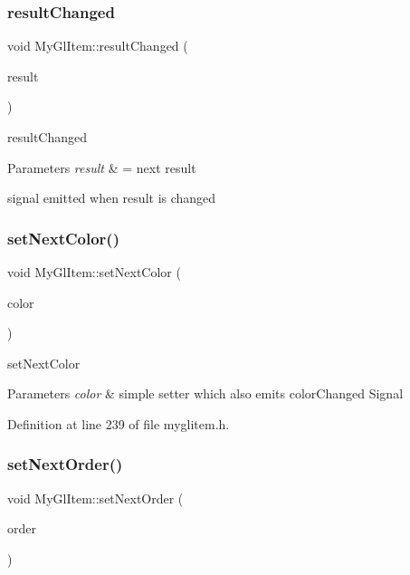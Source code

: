 \subsubsection{\texorpdfstring{resultChanged}{resultChanged}}
{\footnotesize\ttfamily void My\+Gl\+Item\+::result\+Changed (\begin{DoxyParamCaption}\item[{Q\+List$<$ int $>$}]{result }\end{DoxyParamCaption})\hspace{0.3cm}{\ttfamily [signal]}}



result\+Changed 


\begin{DoxyParams}{Parameters}
{\em result} & = next result\\
\hline
\end{DoxyParams}
signal emitted when result is changed \mbox{\label{class_my_gl_item_a1d7b760e5da84802e97825c34be7b354}} 
\subsubsection{\texorpdfstring{setNextColor()}{setNextColor()}}
{\footnotesize\ttfamily void My\+Gl\+Item\+::set\+Next\+Color (\begin{DoxyParamCaption}\item[{Q\+String}]{color }\end{DoxyParamCaption})\hspace{0.3cm}{\ttfamily [inline]}}



set\+Next\+Color 


\begin{DoxyParams}{Parameters}
{\em color} & simple setter which also emits color\+Changed Signal \\
\hline
\end{DoxyParams}


Definition at line 239 of file myglitem.\+h.

\mbox{\label{class_my_gl_item_a4bacae91dba178b2cebfdde56cea364c}} 
\subsubsection{\texorpdfstring{setNextOrder()}{setNextOrder()}}
{\footnotesize\ttfamily void My\+Gl\+Item\+::set\+Next\+Order (\begin{DoxyParamCaption}\item[{Q\+List$<$ Q\+String $>$}]{order }\end{DoxyParamCaption})\hspace{0.3cm}{\ttfamily [inline]}}



